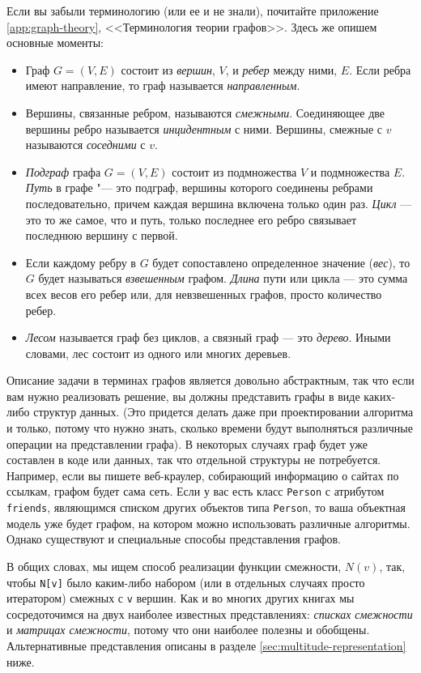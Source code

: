Если вы забыли терминологию (или ее и не знали), почитайте приложение \ref{app:graph-theory}, <<Терминология теории графов>>. Здесь же опишем основные моменты:

\begin{itemize}
\item Граф $G = (V, E)$ состоит из \textit{вершин}, $V$, и \textit{ребер} между ними, $E$. Если ребра имеют направление, то граф называется \textit{направленным}.
\item Вершины, связанные ребром, называются \textit{смежными}. Соединяющее две вершины ребро называется \textit{инцидентным} с ними. Вершины, смежные с $v$ называются \textit{соседними} с $v$.
\item \textit{Подграф} графа $G = (V,E)$ состоит из подмножества $V$ и подмножества $E$. \textit{Путь} в графе "--- это подграф, вершины которого соединены ребрами последовательно, причем каждая вершина включена только один раз. \textit{Цикл} — это то же самое, что и путь, только последнее его ребро связывает последнюю вершину с первой.
\item Если каждому ребру в $G$ будет сопоставлено определенное значение (\textit{вес}), то $G$ будет называться \textit{взвешенным} графом. \textit{Длина} пути или цикла — это сумма всех весов его ребер или, для невзвешенных графов, просто количество ребер.
\item \textit{Лесом} называется граф без циклов, а связный граф — это \textit{дерево}. Иными словами, лес состоит из одного или многих деревьев.
\end{itemize}

Описание задачи в терминах графов является довольно абстрактным, так что если вам нужно реализовать решение, вы должны представить графы в виде каких-либо структур данных. (Это придется делать даже при проектировании алгоритма и только, потому что нужно знать, сколько времени будут выполняться различные операции на представлении графа). В некоторых случаях граф будет уже составлен в коде или данных, так что отдельной структуры не потребуется. Например, если вы пишете веб-краулер, собирающий информацию о сайтах по ссылкам, графом будет сама сеть. Если у вас есть класс \texttt{Person} с атрибутом \texttt{friends}, являющимся списком других объектов типа \texttt{Person}, то ваша объектная модель уже будет графом, на котором можно использовать различные алгоритмы. Однако существуют и специальные способы представления графов.

В общих словах, мы ищем способ реализации функции смежности, $N(v)$, так, чтобы \texttt{N[v]} было каким-либо набором (или в отдельных случаях просто итератором) смежных с \texttt{v} вершин. Как и во многих других книгах мы сосредоточимся на двух наиболее известных представлениях: \textit{списках смежности} и \textit{матрицах смежности}, потому что они наиболее полезны и обобщены. Альтернативные представления описаны в разделе \ref{sec:multitude-representation} ниже.

